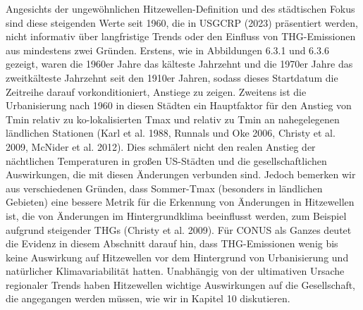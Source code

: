 \documentclass[12pt,paper=a4,DIV=12,parskip=never,chapterprefix=false,headings=standardclasses]{scrreprt}
\begin{document}
Angesichts der ungewöhnlichen Hitzewellen-Definition und des städtischen Fokus sind diese steigenden Werte seit 1960, die in USGCRP (2023) präsentiert werden, nicht informativ über langfristige Trends oder den Einfluss von THG-Emissionen aus mindestens zwei Gründen. Erstens, wie in Abbildungen 6.3.1 und 6.3.6 gezeigt, waren die 1960er Jahre das kälteste Jahrzehnt und die 1970er Jahre das zweitkälteste Jahrzehnt seit den 1910er Jahren, sodass dieses Startdatum die Zeitreihe darauf vorkonditioniert, Anstiege zu zeigen. Zweitens ist die Urbanisierung nach 1960 in diesen Städten ein Hauptfaktor für den Anstieg von Tmin relativ zu ko-lokalisierten Tmax und relativ zu Tmin an nahegelegenen ländlichen Stationen (Karl et al. 1988, Runnals und Oke 2006, Christy et al. 2009, McNider et al. 2012). Dies schmälert nicht den realen Anstieg der nächtlichen Temperaturen in großen US-Städten und die gesellschaftlichen Auswirkungen, die mit diesen Änderungen verbunden sind. Jedoch bemerken wir aus verschiedenen Gründen, dass Sommer-Tmax (besonders in ländlichen Gebieten) eine bessere Metrik für die Erkennung von Änderungen in Hitzewellen ist, die von Änderungen im Hintergrundklima beeinflusst werden, zum Beispiel aufgrund steigender THGs (Christy et al. 2009). Für CONUS als Ganzes deutet die Evidenz in diesem Abschnitt darauf hin, dass THG-Emissionen wenig bis keine Auswirkung auf Hitzewellen vor dem Hintergrund von Urbanisierung und natürlicher Klimavariabilität hatten. Unabhängig von der ultimativen Ursache regionaler Trends haben Hitzewellen wichtige Auswirkungen auf die Gesellschaft, die angegangen werden müssen, wie wir in Kapitel 10 diskutieren.
\end{document}
